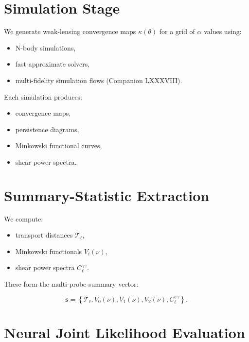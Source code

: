 \documentclass[11pt,a4paper]{article}
\begin{document}
\section{Simulation Stage}

We generate weak-lensing convergence maps $\kappa(\theta)$ for a grid of $\alpha$ 
values using:

\begin{itemize}
    \item N-body simulations,
    \item fast approximate solvers,
    \item multi-fidelity simulation flows (Companion LXXXVIII).
\end{itemize}

Each simulation produces:

\begin{itemize}
    \item convergence maps,
    \item persistence diagrams,
    \item Minkowski functional curves,
    \item shear power spectra.
\end{itemize}
\section{Summary-Statistic Extraction}

We compute:

\begin{itemize}
    \item transport distances $\mathcal{T}_{\ell}$,
    \item Minkowski functionals $V_{i}(\nu)$,
    \item shear power spectra $C_{\ell}^{\gamma\gamma}$.
\end{itemize}

These form the multi-probe summary vector:



\[
    \mathbf{s}
    =
    \left\{
        \mathcal{T}_{\ell},
        V_{0}(\nu),
        V_{1}(\nu),
        V_{2}(\nu),
        C_{\ell}^{\gamma\gamma}
    \right\}.
\]


\section{Neural Joint Likelihood Evaluation}
\end{document}
